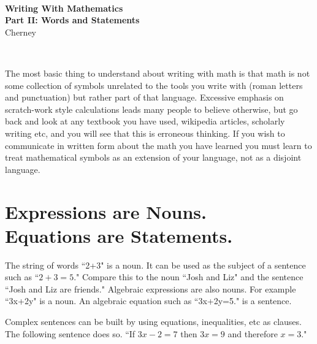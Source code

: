 \documentclass[12pt]{article}
\begin{document}
\thispagestyle{empty}
~
\vspace{-3.9cm}
\begin{center}
{
\Large
 {\bf  Writing With Mathematics \\
 Part II: Words and Statements }  \\[10mm]
 {  
 \vspace{-.9cm} 
Cherney}\\[1mm]
\vspace{3.5mm}
}

\end{center}
\


The most basic thing to understand about writing with math is that math is not some collection of symbols unrelated to the tools you write with (roman letters and punctuation) but rather part of that language. Excessive emphasis on scratch-work style calculations leads many people to believe otherwise, but go back and look at any textbook you have used, wikipedia articles, scholarly writing etc, and you will see that this is erroneous thinking. If you wish to communicate in written form about the math you have learned you must learn to treat mathematical symbols as an extension of your language, not as a disjoint language. 

\section{Expressions are Nouns.\\ Equations are Statements.}
The string of words ``2+3" is a noun. 
It can be used as the subject of a sentence such as ``$2+3=5.$" 
Compare this to the noun ``Josh and Liz" and the sentence ``Josh and Liz are friends." 
Algebraic expressions are also nouns. For example ``3x+2y" is a noun.  An algebraic equation such as ``3x+2y=5." is a sentence. 

Complex sentences can be built by using  equations, inequalities, etc as clauses. 
The following sentence does so. 
``If $3x-2=7$ then $3x=9$ and therefore $x=3$."
\\
\end{document}
